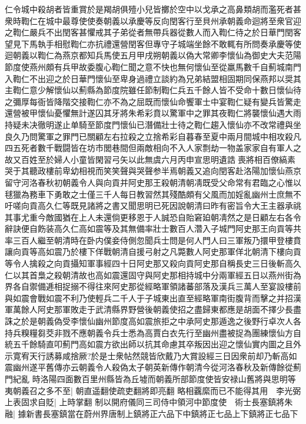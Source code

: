 {仁令城中殺胡者皆重賞於是羯胡俱殪小兒皆擲於空中以戈承之高鼻類胡而濫死者甚衆時鞫仁在城中最尊使使奏朝義以承慶等反向閏客行至貝州承朝義命迴將至衆官迎之鞫仁嚴兵不出閏客甚懼戒其子弟從者無帶兵器從數人而入鞫仁待之於日華門閏客望見下馬執手相慰鞫仁亦抗禮還營閏客但專守子城端坐餘不敢輒有所問奏承慶等使迴朝義以鞫仁為燕京都知兵馬使五月甲戌朔朝義以偽大常卿李懷仙為御史大夫范陽節度使燕州頗有兵甲故委腹心鞫仁聞之意不快也無何懷仙至從羸馬數千自薊城南門入鞫仁不出迎之於日華門懷仙至卑身過禮立談約為兄弟結盟相固期同保燕邦以奨其主鞫仁意少解懷仙以薊縣為節度院雖任節制鞫仁兵五千餘人皆不受命十數日懷仙待之彌厚每衙皆降階交接鞫仁亦不為之屈既而懷仙命饗軍士中宴鞫仁疑有變兵皆驚走還營被甲懷仙憂懼無計遂囚其牙將朱希彩賁以驚軍中之罪其夜鞫仁將襲懷仙遇大雨持疑未决徹明遂止单騎至節度門懷仙已潛備壯士待之鞫仁趨入懷仙亦不改常禮與坐良久乃問驚軍之罪門已關顧左右拉殺之立捨希彩自暮春至夏中兩月間城中相攻殺凡四五死者數千戰闘皆在坊市閭巷間但兩敵相向不入人家剽劫一物盖家家自有軍人之故又百姓至於婦人小童皆閑習弓矢以此無虞六月丙申宣思明遺誥喪將相百僚縞素哭于其聽政樓前卑幼相視而笑笑聲與哭聲参半焉朝義又追向閏客赴洛陽加懷仙燕京留守河洛春秋初朝義令人與向貢并阿史那王殺朝清朝凊既受父命常有君臨之心惟以毬獵為務車下勇敢之士僅三千人每日教習然其殘酷頗有父風而加婬亂幽州士庶無不吁嗟向貢高久仁等既見諸將之書又聞思明已死因說朝清曰昨有密旨令大王主器承祧其事尤重今敵國猶在上人未還倘更移恩于人誠恐自貽窘廹朝凊然之是日顧左右各令辭訣便自飭装高久仁高如震等及其無備率壯士數百人濳入子城門阿史那王向貢等共率三百人繼至朝清時在卧内僕妾侍側忽聞兵士問是何人門人曰三軍叛乃擐甲登樓賁讓向貢等高如震乃於樓下佯戰朝清自援弓射之凡斃數人阿史那軍佯北朝清下樓向貢等令人擒殺之向貢攝知軍事經四十日阿史那又殺向貢阿史那自稱長史三日後斬高久仁以其首梟之殺朝清故也高如震還固守與阿史那相持城中分兩軍經五日以燕州街為界各自禦備逓相捉搦不得往來阿史那從經略軍領諸蕃部落及漢兵三萬人至宴設樓前與如震會戰如震不利乃使輕兵二千人于子城東出直至經略軍南街腹背而擊之并招漢軍萬餘人阿史那軍敗走于武清縣界野營後朝義使招之盡歸東都應是胡面不擇少長盡誅之於是朝義偽受李懷仙幽州節度高如震旅拒之中承阿史那遁逸之後野行卓次人各持兵糗糧芻茭非戮不應朝義令兵士悉為高賈白衣先行至幽州盡被捉為團練懷仙方自統五千餘騎直叩薊門高如震方欲出師以抗其命慮其卒叛因出迎之懷仙實内圖之且外示寛宥天行誘募咸捨厥?於是士衆帖然競皆欣戴乃大賞設經三日因衆前却乃斬高如震幽州遂平舊傳亦云朝義令人殺偽太子朝英新傳作朝清今從河洛春秋及新傳餘從薊門紀亂}
時洛陽四面數百里州縣皆為丘墟而朝義所部節度使皆安禄山舊將與思明等夷朝義召之多不至|{
	朝直遥翻使疏吏翻將即亮翻}
略相覊縻而已不能得其用　李光弼上表固求自貶|{
	上時掌翻}
制以開府儀同三司侍中領河中節度使　術士長塞鎮將朱融|{
	據新書長塞鎮當在蔚州界唐制上鎮將正六品下中鎮將正七品上下鎮將正七品下}
